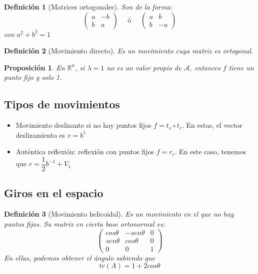 \documentclass[11pt, a4paper, titlepage]{article}
\newcommand{\R}{\mathbb{R}}
\theoremstyle{theorem-style}
\newtheorem*{nprop}{Proposición}
\theoremstyle{definition-style}
\newtheorem*{ndef}{Definición}
\theoremstyle{remark-style}
\theoremstyle{example-style}
\begin{document}
\begin{ndef}[Matrices ortogonales]
  Son de la forma:
  \[
    \begin{pmatrix}
      a & -b \\
      b & a 
    \end{pmatrix} \quad \text { ó } \quad \begin{pmatrix}
      a & b \\
      b & -a 
    \end{pmatrix}
  \]
  con $a^2+b^2 = 1$
\end{ndef}

\begin{ndef}[Movimiento directo]
  Es un movimiento cuya matriz es ortogonal. 
\end{ndef}
\begin{nprop}
  En $\R^n$, si $\lambda = 1$ no es un valor propio de $\mathcal A$, entonces $f$ tiene un punto fijo y solo 1.
\end{nprop}

\subsection{Tipos de movimientos}
\begin{itemize}
\item Movimiento deslizante si no hay puntos fijos $f = t_v \circ t_r$. En estas, el vector deslizamiento es $v=b^1$
\item Auténtica reflexión: reflexión con puntos fijos $f=r_r$. En este caso, tenemos que $r= \dfrac{1}{2}b^{-1}+V_1$
\end{itemize}

\subsection{Giros en el espacio}
\begin{ndef}[Movimiento helicoidal]
  Es un movimiento en el que no hay puntos fijos. Su matriz en cierta base ortonormal es:
  \[
    \begin{pmatrix}
      cos \theta & -sen\theta & 0 \\
      sen \theta & cos\theta & 0\\
      0 & 0 & 1
    \end{pmatrix} 
  \]
  En ellas, podemos obtener el ángulo sabiendo que 
  \[
    tr(A) = 1+2cos\theta
  \]
\end{ndef}

\end{document}
